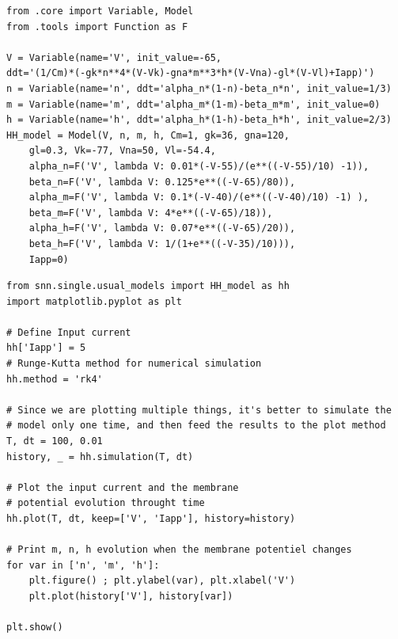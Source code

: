 \documentclass[12pt]{scrartcl}
\begin{document}
\begin{lstlisting}[caption = {Hodgkin-Huxley : Définition du modèle}]
from .core import Variable, Model
from .tools import Function as F

V = Variable(name='V', init_value=-65,
ddt='(1/Cm)*(-gk*n**4*(V-Vk)-gna*m**3*h*(V-Vna)-gl*(V-Vl)+Iapp)')
n = Variable(name='n', ddt='alpha_n*(1-n)-beta_n*n', init_value=1/3)
m = Variable(name='m', ddt='alpha_m*(1-m)-beta_m*m', init_value=0)
h = Variable(name='h', ddt='alpha_h*(1-h)-beta_h*h', init_value=2/3)
HH_model = Model(V, n, m, h, Cm=1, gk=36, gna=120, 
	gl=0.3, Vk=-77, Vna=50, Vl=-54.4, 
	alpha_n=F('V', lambda V: 0.01*(-V-55)/(e**((-V-55)/10) -1)), 
	beta_n=F('V', lambda V: 0.125*e**((-V-65)/80)),
	alpha_m=F('V', lambda V: 0.1*(-V-40)/(e**((-V-40)/10) -1) ),
	beta_m=F('V', lambda V: 4*e**((-V-65)/18)),
	alpha_h=F('V', lambda V: 0.07*e**((-V-65)/20)),
	beta_h=F('V', lambda V: 1/(1+e**((-V-35)/10))), 
	Iapp=0)
\end{lstlisting}

\begin{lstlisting}[caption = {Hodgkin-Huxley : Simulation du modèle pour $I_{app} = 5$}]
from snn.single.usual_models import HH_model as hh
import matplotlib.pyplot as plt

# Define Input current
hh['Iapp'] = 5
# Runge-Kutta method for numerical simulation
hh.method = 'rk4'

# Since we are plotting multiple things, it's better to simulate the
# model only one time, and then feed the results to the plot method
T, dt = 100, 0.01
history, _ = hh.simulation(T, dt)

# Plot the input current and the membrane 
# potential evolution throught time
hh.plot(T, dt, keep=['V', 'Iapp'], history=history)

# Print m, n, h evolution when the membrane potentiel changes
for var in ['n', 'm', 'h']:
	plt.figure() ; plt.ylabel(var), plt.xlabel('V')
	plt.plot(history['V'], history[var])

plt.show()
\end{lstlisting}
\end{document}
